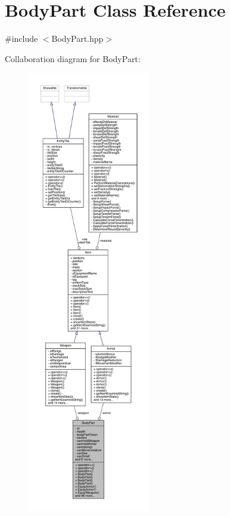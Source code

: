 \hypertarget{class_body_part}{}\section{Body\+Part Class Reference}
\label{class_body_part}


{\ttfamily \#include $<$Body\+Part.\+hpp$>$}



Collaboration diagram for Body\+Part\+:
\nopagebreak
\begin{figure}[H]
\begin{center}
\leavevmode
\includegraphics[height=550pt]{df/dc2/class_body_part__coll__graph}
\end{center}
\end{figure}
